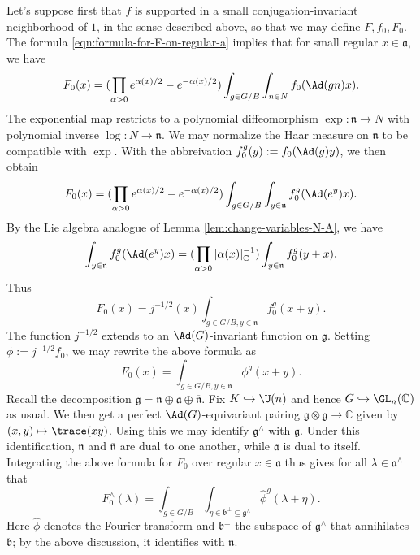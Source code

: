 \documentclass[reqno]{amsart} 
\begin{document}
Let's suppose first that $f$ is supported in a small conjugation-invariant neighborhood of $1$, in the sense described above, so that we may define $F, f_0, F_0$.  The formula \eqref{eqn:formula-for-F-on-regular-a} implies that for small regular $x \in \mathfrak{a}$, we have
\begin{equation*}
  F_0(x)
  =
  (
  \prod _{\alpha > 0 }
  e ^{\alpha(x)/2}
  - e^{-\alpha(x)/2}
  )
  \int_{g \in G/B}
  \int_{n \in N}
  f_0(\Ad(g n) x).
\end{equation*}
The exponential map restricts to a polynomial diffeomorphism $\exp : \mathfrak{n} \rightarrow N$ with polynomial inverse $\log : N \rightarrow \mathfrak{n}$.  We may normalize the Haar measure on $\mathfrak{n}$ to be compatible with $\exp$.  With the abbreivation $f_0^g(y) := f_0(\Ad(g) y)$, we then obtain
\begin{equation*}
  F_0(x)
  = 
  (
  \prod _{\alpha > 0 }
  e ^{\alpha(x)/2}
  - e^{-\alpha(x)/2}
  )
  \int_{g \in G/B}
  \int_{y \in \mathfrak{n}}
  f_0^g(\Ad(e^y) x).
\end{equation*}
By the Lie algebra analogue of Lemma \ref{lem:change-variables-N-A}, we have
\begin{equation}\label{eqn:lie-algebra-change-of-var}
  \int_{y \in \mathfrak{n}}
  f_0^g(\Ad(e^y) x)
  =
  (
  \prod_{\alpha>0} |\alpha(x)|_{\mathbb{C}}^{-1}
  )
  \int_{y \in \mathfrak{n}}
  f_0^g(y + x).
\end{equation}
Thus
\begin{equation*}
  F_0(x)
  = j^{-1/2}(x)
  \int_{g \in G/B, y \in \mathfrak{n}}
  f_0^g(x+y).
\end{equation*}
The function $j^{-1/2}$ extends to an $\Ad(G)$-invariant function on $\mathfrak{g}$.  Setting $\phi := j^{-1/2} f_0$, we may rewrite the above formula as
\begin{equation*}
  F_0(x)
  = \int_{g \in G/B, y \in \mathfrak{n}}
  \phi^g(x+y).
\end{equation*}
Recall the decomposition $\mathfrak{g} = \mathfrak{n} \oplus \mathfrak{a} \oplus \overline{\mathfrak{n} }$.  Fix $K \hookrightarrow \U(n)$ and hence $G \hookrightarrow \GL_n(\mathbb{C})$ as usual.  We then get a perfect $\Ad(G)$-equivariant pairing $\mathfrak{g} \otimes \mathfrak{g} \rightarrow \mathbb{C}$ given by $(x,y) \mapsto \trace(x y)$.  Using this we may identify $\mathfrak{g}^\wedge$ with $\mathfrak{g}$.  Under this identification, $\mathfrak{n}$ and $\overline{\mathfrak{n}}$ are dual to one another, while $\mathfrak{a}$ is dual to itself.  Integrating the above formula for $F_0$ over regular $x \in \mathfrak{a}$ thus gives for all $\lambda \in \mathfrak{a}^\wedge$ that
\begin{equation*}
  F_0^\wedge(\lambda)
  = \int_{g \in G/B}
  \int_{\eta \in \mathfrak{b}^\perp \subseteq
    \mathfrak{g}^\wedge}
  \hat{\phi}^g(\lambda+\eta).
\end{equation*}
Here $\hat{\phi}$ denotes the Fourier transform and $\mathfrak{b}^\perp$ the subspace of $\mathfrak{g}^\wedge$ that annihilates $\mathfrak{b}$; by the above discussion, it identifies with $\mathfrak{n}$.
\end{document}
